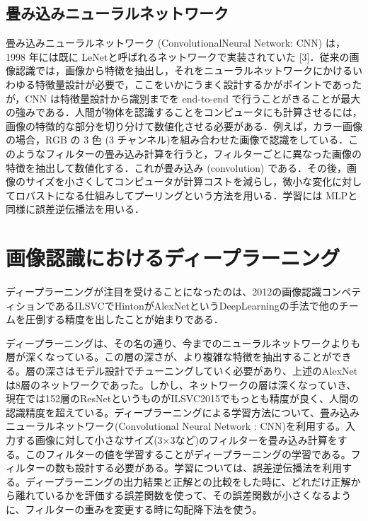 \subsection*{畳み込みニューラルネットワーク}
畳み込みニューラルネットワーク (ConvolutionalNeural Network: CNN) は，1998 年には既に LeNetと呼ばれるネットワークで実装されていた [3]．従来の画像認識では，画像から特徴を抽出し，それをニューラルネットワークにかけるいわゆる特徴量設計が必要で，ここをいかにうまく設計するかがポイントであったが，CNN は特徴量設計から識別までを end-to-end で行うことがきることが最大の強みである．人間が物体を認識することをコンピュータにも計算させるには，画像の特徴的な部分を切り分けて数値化させる必要がある．例えば，カラー画像の場合，RGB の 3 色 (3 チャンネル)を組み合わせた画像で認識をしている．このようなフィルターの畳み込み計算を行うと，フィルターごとに異なった画像の特徴を抽出して数値化する．これが畳み込み (convolution) である．その後，画像のサイズを小さくしてコンピュータが計算コストを減らし，微小な変化に対してロバストになる仕組みしてプーリングという方法を用いる．学習には MLPと同様に誤差逆伝播法を用いる．

\section{画像認識におけるディープラーニング}
ディープラーニングが注目を受けることになったのは、2012の画像認識コンペティションであるILSVCでHintonがAlexNetというDeepLearningの手法で他のチームを圧倒する精度を出したことが始まりである．

ディープラーニングは、その名の通り、今までのニューラルネットワークよりも層が深くなっている。この層の深さが、より複雑な特徴を抽出することができる。層の深さはモデル設計でチューニングしていく必要があり、上述のAlexNetは8層のネットワークであった。しかし、ネットワークの層は深くなっていき、現在では152層のResNetというものがILSVC2015でもっとも精度が良く、人間の認識精度を超えている。ディープラーニングによる学習方法について、畳み込みニューラルネットワーク(Convolutional Neural Network : CNN)を利用する。入力する画像に対して小さなサイズ(3×3など)のフィルターを畳み込み計算をする。このフィルターの値を学習することがディープラーニングの学習である。フィルターの数も設計する必要がある。学習については、誤差逆伝播法を利用する。ディープラーニングの出力結果と正解との比較をした時に、どれだけ正解から離れているかを評価する誤差関数を使って、その誤差関数が小さくなるように、フィルターの重みを変更する時に勾配降下法を使う。


